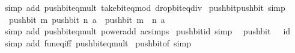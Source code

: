 \begin{isabellebody}
\ {\isacharparenleft}{\kern0pt}simp\ add{\isacharcolon}{\kern0pt}\ push{\isacharunderscore}{\kern0pt}bit{\isacharunderscore}{\kern0pt}eq{\isacharunderscore}{\kern0pt}mult\ take{\isacharunderscore}{\kern0pt}bit{\isacharunderscore}{\kern0pt}eq{\isacharunderscore}{\kern0pt}mod\ drop{\isacharunderscore}{\kern0pt}bit{\isacharunderscore}{\kern0pt}eq{\isacharunderscore}{\kern0pt}div{\isacharparenright}{\kern0pt}%
\endisatagproof
{\isafoldproof}%
%
\isadelimproof
\isanewline
%
\endisadelimproof
\isanewline
{}\isamarkupfalse%
\ push{\isacharunderscore}{\kern0pt}bit{\isacharunderscore}{\kern0pt}push{\isacharunderscore}{\kern0pt}bit\ {\isacharbrackleft}{\kern0pt}simp{\isacharbrackright}{\kern0pt}{\isacharcolon}{\kern0pt}\isanewline
\ \ {\isachardoublequoteopen}push{\isacharunderscore}{\kern0pt}bit\ m\ {\isacharparenleft}{\kern0pt}push{\isacharunderscore}{\kern0pt}bit\ n\ a{\isacharparenright}{\kern0pt}\ {\isacharequal}{\kern0pt}\ push{\isacharunderscore}{\kern0pt}bit\ {\isacharparenleft}{\kern0pt}m\ {\isacharplus}{\kern0pt}\ n{\isacharparenright}{\kern0pt}\ a{\isachardoublequoteclose}\isanewline
%
\isadelimproof
\ \ %
\endisadelimproof
%
\isatagproof
{}\isamarkupfalse%
\ {\isacharparenleft}{\kern0pt}simp\ add{\isacharcolon}{\kern0pt}\ push{\isacharunderscore}{\kern0pt}bit{\isacharunderscore}{\kern0pt}eq{\isacharunderscore}{\kern0pt}mult\ power{\isacharunderscore}{\kern0pt}add\ ac{\isacharunderscore}{\kern0pt}simps{\isacharparenright}{\kern0pt}%
\endisatagproof
{\isafoldproof}%
%
\isadelimproof
\isanewline
%
\endisadelimproof
\isanewline
{}\isamarkupfalse%
\ push{\isacharunderscore}{\kern0pt}bit{\isacharunderscore}{\kern0pt}{}{\isacharunderscore}{\kern0pt}id\ {\isacharbrackleft}{\kern0pt}simp{\isacharbrackright}{\kern0pt}{\isacharcolon}{\kern0pt}\isanewline
\ \ {\isachardoublequoteopen}push{\isacharunderscore}{\kern0pt}bit\ {}\ {\isacharequal}{\kern0pt}\ id{\isachardoublequoteclose}\isanewline
%
\isadelimproof
\ \ %
\endisadelimproof
%
\isatagproof
{}\isamarkupfalse%
\ {\isacharparenleft}{\kern0pt}simp\ add{\isacharcolon}{\kern0pt}\ fun{\isacharunderscore}{\kern0pt}eq{\isacharunderscore}{\kern0pt}iff\ push{\isacharunderscore}{\kern0pt}bit{\isacharunderscore}{\kern0pt}eq{\isacharunderscore}{\kern0pt}mult{\isacharparenright}{\kern0pt}%
\endisatagproof
{\isafoldproof}%
%
\isadelimproof
\isanewline
%
\endisadelimproof
\isanewline
{}\isamarkupfalse%
\ push{\isacharunderscore}{\kern0pt}bit{\isacharunderscore}{\kern0pt}of{\isacharunderscore}{\kern0pt}{}\ {\isacharbrackleft}{\kern0pt}simp{\isacharbrackright}{\kern0pt}{\isacharcolon}{\kern0pt}\isanewline

\end{isabellebody}
